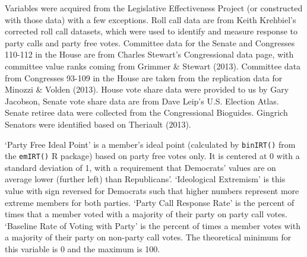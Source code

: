 \documentclass[12pt]{article}
\begin{document}
Variables were acquired from the Legislative Effectiveness Project (or constructed with those data) with a few exceptions. Roll call data are from Keith Krehbiel's corrected roll call datasets, which were used to identify and measure response to party calls and party free votes. Committee data for the Senate and Congresses 110-112 in the House are from Charles Stewart's Congressional data page, with committee value ranks coming from Grimmer \& Stewart (2013). Committee data from Congresses 93-109 in the House are taken from the replication data for Minozzi \& Volden (2013). House vote share data were provided to us by Gary Jacobson, Senate vote share data are from Dave Leip's U.S. Election Atlas. Senate retiree data were collected from the Congressional Bioguides. Gingrich Senators were identified based on Theriault (2013).

`Party Free Ideal Point' is a member's ideal point (calculated by \verb|binIRT()| from the \verb|emIRT()| R package) based on party free votes only. It is centered at 0 with a standard deviation of 1, with a requirement that Democrats' values are on average lower (further left) than Republicans'. `Ideological Extremism' is this value with sign reversed for Democrats such that higher numbers represent more extreme members for both parties. `Party Call Response Rate' is the percent of times that a member voted with a majority of their party on party call votes. `Baseline Rate of Voting with Party' is the percent of times a member votes with a majority of their party on non-party call votes. The theoretical minimum for this variable is 0 and the maximum is 100.
\end{document}
